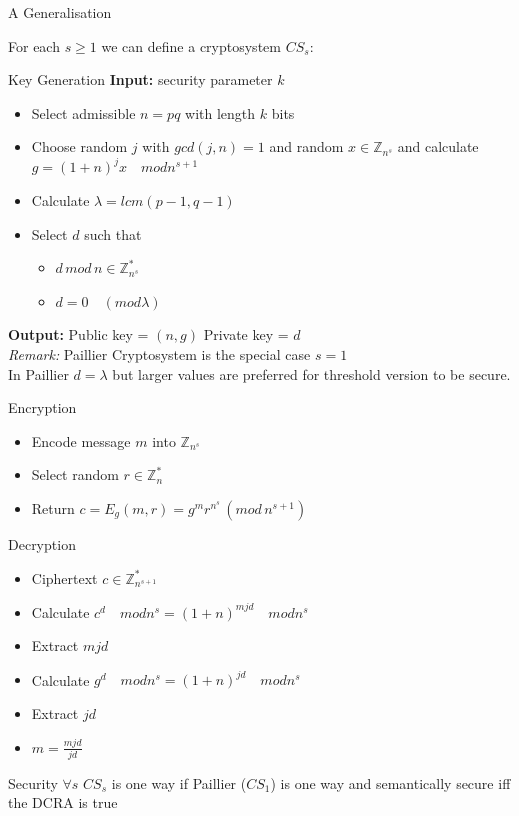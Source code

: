 \documentclass{beamer}
\begin{document}
\begin{frame}[allowframebreaks]{A Generalisation \cite{Damgard:2001:GSA:648118.746742}}

For each $s \geq 1$ we can define a cryptosystem $CS_s$:

\begin{block}{Key Generation}
\textbf{Input:} security parameter $k$
\begin{itemize}
\item Select admissible $n = p  q$ with length $k$ bits
\item Choose random $j$ with $gcd(j,n)=1$ and random $x \in \mathbb{Z}_{n^s}$ and calculate $ g = (1+n)^j  x \quad mod n^{s+1}$
\item Calculate $\lambda = lcm(p-1,q-1)$
\item Select $d$ such that
\begin{itemize}
\item $d \, mod \, n \in \mathbb{Z}^{*}_{n^s}$
\item $d = 0 \quad (mod \lambda)$
\end{itemize}
\end{itemize}
\textbf{Output:} Public key = $(n,g)$ Private key = $d$ \\
\emph{Remark:} Paillier Cryptosystem is the special case $s = 1$ \\
In Paillier $d = \lambda$ but larger values are preferred for threshold version to be secure.
\end{block}

\begin{block}{Encryption}
\begin{itemize}
\item Encode message $m$ into $\mathbb{Z}_{n^s}$
\item Select random $r \in \mathbb{Z}^*_n$
\item Return $c = E_{g}(m,r) = g^m  r^{n^s} \, ( mod \, n^{s+1} )$
\end{itemize}
\end{block}

\begin{block}{Decryption}
\begin{itemize}
\item Ciphertext $c \in \mathbb{Z}^*_{n^{s+1}}$
\item Calculate $c^d \quad mod n^s = (1+n)^{m  j  d} \quad mod n^s  $
\item Extract $m  j  d$
\item Calculate $g^d \quad mod n^s = (1+n)^{ j  d} \quad mod n^s  $
\item Extract $ j  d$
\item $ m =\frac{m  j  d}{j  d}$
\end{itemize}
\end{block}

\begin{block}{Security}
$\forall s$ $CS_s$ is one way if Paillier ($CS_1$) is one way and semantically secure iff the DCRA is true
\end{block}

\end{frame}
\end{document}
